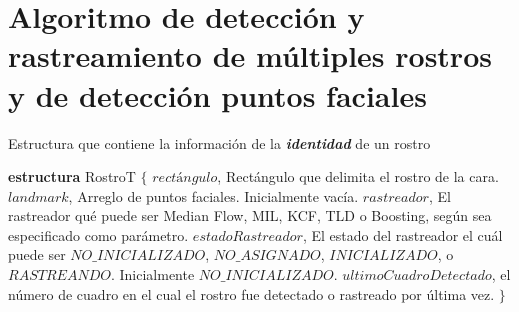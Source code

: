\documentclass[a4paper,openright,12pt]{report}
\begin{document}
\section{Algoritmo de detección y rastreamiento de múltiples rostros y
de detección puntos faciales}

\begin{algorithm}
\caption{Estructura que contiene la información de la \textit{\textbf{identidad}}
         de un rostro}
\label{euclid}
\begin{algorithmic}
\State \textbf{estructura} RostroT $\{$
\Indent
  \State $rectángulo$, Rectángulo que delimita el rostro de la cara.
  \State $landmark$, Arreglo de puntos faciales. Inicialmente vacía.
  \State $rastreador$, El rastreador qué puede ser Median Flow, MIL,
                        KCF, TLD o Boosting, según sea especificado como
                       parámetro.
  \State $estadoRastreador$, El estado del rastreador el cuál puede ser
                            $NO\_INICIALIZADO$, $NO\_ASIGNADO$, $INICIALIZADO$,
                            o $RASTREANDO$. Inicialmente $NO\_INICIALIZADO$.
  \State $ultimoCuadroDetectado$, el número de cuadro en el cual el rostro fue
                                 detectado o rastreado por última vez.
\EndIndent
\State  $\}$
\end{algorithmic}
\end{algorithm}
\end{document}
